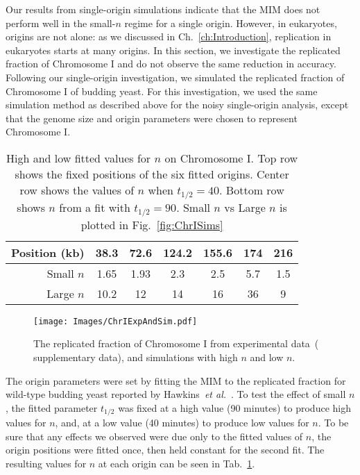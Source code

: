 	Our results from single-origin simulations indicate that the MIM does not perform well in the small-$n$ regime for a single origin.
	However, in eukaryotes, origins are not alone: as we discussed in Ch.~\ref{ch:Introduction}, replication in eukaryotes starts at many origins.
	In this section, we investigate the replicated fraction of Chromosome I and do not observe the same reduction in accuracy.
	Following our single-origin investigation, we simulated the replicated fraction of Chromosome I of budding yeast.
	For this investigation, we used the same simulation method as described above for the noisy single-origin analysis, except that the genome size and origin parameters were chosen to represent Chromosome I.
	
	\begin{table}[tbh]
		\begin{center}
			\begin{tabular}{| r | c | c | c | c | c | c |}	
				\hline
				Position (kb)	&	38.3	&	72.6	&	124.2	&	155.6	&	174	&	216	\\	\hline
				Small $n$	&	1.65	&	1.93	&	2.3	&	2.5	&	5.7	&	1.5	\\
				Large $n$	&	10.2	&	12	&	14	&	16	&	36	&	9	\\	\hline
			\end{tabular}
		\end{center}
		
		\caption[High and low $n$ fit values for Chromosome I]{\label{tab:LargeAndSmallN}
			High and low fitted values for $n$ on Chromosome I.
			Top row shows the fixed positions of the six fitted origins.
			Center row shows the values of $n$ when $t_{1/2}=40$.
			Bottom row shows $n$ from a fit with $t_{1/2}=90$.
			Small $n$ vs Large $n$ is plotted in Fig.~\ref{fig:ChrISims}
		}
	\end{table}
		
	\begin{figure}[tbh]
		\begin{center}
			\texttt{[image: Images/ChrIExpAndSim.pdf]}
		\end{center}
			\caption[Experimental and Simulated Replicated Fraction of Chromosome I]{\label{fig:ThisFigure} 
				The replicated fraction of Chromosome I from experimental data~(\cite{StochasticTermination} supplementary data), and simulations with high $n$ and low $n$.
			}
	\end{figure} 

	The origin parameters were set by fitting the MIM to the replicated fraction for wild-type budding yeast reported by Hawkins~\emph{et al.}~\cite{StochasticTermination}.
	To test the effect of small $n$, the fitted parameter $t_{1/2}$ was fixed at a high value (90 minutes) to produce high values for $n$, and, at a low value (40 minutes) to produce low values for $n$.
	To be sure that any effects we observed were due only to the fitted values of $n$, the origin positions were fitted once, then held constant for the second fit.
	The resulting values for $n$ at each origin can be seen in Tab.~\ref{tab:LargeAndSmallN}.
		
